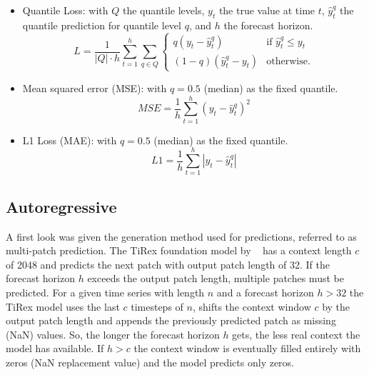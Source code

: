 \documentclass[a4paper,oneside,10pt,ngerman,english]{scrartcl}
\begin{document}
\begin{itemize}[]
	\item Quantile Loss: with $Q$ the quantile levels, $y_t$ the true value at time $t$, $\hat{y}_t^q$ the quantile prediction for quantile level $q$, and $h$ the forecast horizon.
	\begin{equation}
		L = \frac{1}{|Q| \cdot h} \sum_{t=1}^{h} \sum_{q \in Q} 
		\begin{cases} 
			q (y_t - \hat{y}_t^q) & \text{if } \hat{y}_t^q \le y_t \\
			(1 - q) (\hat{y}_t^q - y_t) & \text{otherwise.}
		\end{cases}
	\label{eq:quantile_loss}
	\end{equation}

	\item Mean squared error (MSE): with $q=0.5$ (median) as the fixed quantile.
	\begin{equation}
		MSE = \frac{1}{h} \sum_{t=1}^{h} (y_t - \hat{y}_t^q)^2
	\end{equation}	
	
	\item L1 Loss (MAE): with $q=0.5$ (median) as the fixed quantile.
	\begin{equation}
		L1 = \frac{1}{h} \sum_{t=1}^{h}  |y_t - \hat{y}_t^q|
	\end{equation}	
\end{itemize}


\subsection{Autoregressive}
\label{sec:autoregressive}

A first look was given the generation method used for predictions, referred to as multi-patch prediction. The TiRex foundation model by  \citeauthor{auer2025tirexzeroshotforecastinglong}~\cite{auer2025tirexzeroshotforecastinglong} has a context length $c$ of 2048 and predicts the next patch with output patch length of 32. If the forecast horizon $h$ exceeds the output patch length, multiple patches must be predicted. For a given time series with length $n$ and a forecast horizon $h>32$ the TiRex model uses the last $c$ timesteps of $n$, shifts the context window $c$ by the output patch length and appends the previously predicted patch as missing (NaN) values. So, the longer the forecast horizon $h$ gets, the less real context the model has available. If $h>c$ the context window is eventually filled entirely with zeros (NaN replacement value) and the model predicts only zeros.
\end{document}
